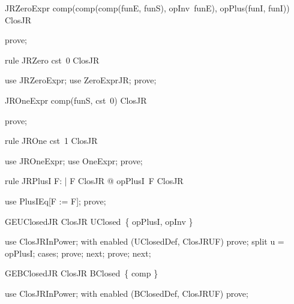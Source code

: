 \documentclass{article}
\begin{document}
\begin{theorem}{JRZeroExpr}
  comp(comp(comp(funE, funS), opInv~funE), opPlus(funI, funI)) \in ClosJR
\end{theorem}

\begin{zproof}
prove;
\end{zproof}

\begin{theorem}{rule JRZero}
  cst~0 \in ClosJR
\end{theorem}

\begin{zproof}
use JRZeroExpr;
use ZeroExprJR;
prove;
\end{zproof}

\begin{theorem}{JROneExpr}
  comp(funS, cst~0) \in ClosJR
\end{theorem}

\begin{zproof}
prove;
\end{zproof}

\begin{theorem}{rule JROne}
  cst~1 \in ClosJR
\end{theorem}

\begin{zproof}
use JROneExpr;
use OneExpr;
prove;
\end{zproof}


\begin{theorem}{rule JRPlusI}
  \forall F: \nat \fun \nat | F \in ClosJR @ opPlusI~F \in ClosJR
\end{theorem}

\begin{zproof}
use PlusIEq[F := F];
prove;
\end{zproof}

\begin{theorem}{GEUClosedJR}
  ClosJR \in UClosed~\{ opPlusI, opInv \}
\end{theorem}

\begin{zproof}
use ClosJRInPower;
with enabled (UClosedDef, ClosJRUF) prove;
split u = opPlusI;
cases;
prove;
next;
prove;
next;
\end{zproof}

\begin{theorem}{GEBClosedJR}
  ClosJR \in BClosed~\{ comp \}
\end{theorem}

\begin{zproof}
use ClosJRInPower;
with enabled (BClosedDef, ClosJRUF) prove;
\end{zproof}
\end{document}
